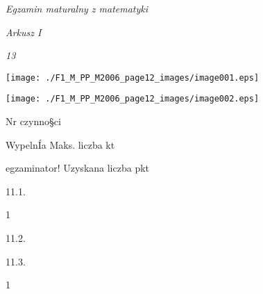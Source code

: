 \documentclass[a4paper,12pt]{article}
\begin{document}
{\it Egzamin maturalny z matematyki}

{\it Arkusz I}

{\it 13}
\begin{center}
\texttt{[image: ./F1\_M\_PP\_M2006\_page12\_images/image001.eps]}

\texttt{[image: ./F1\_M\_PP\_M2006\_page12\_images/image002.eps]}
\end{center}
Nr czynno\S ci

WypelnÍa Maks. liczba kt

egzaminator! Uzyskana liczba pkt

11.1.

1

11.2.

11.3.

1
\end{document}
